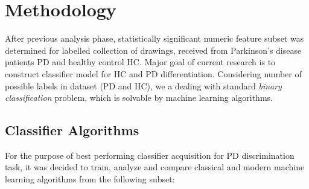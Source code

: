 \section{Methodology}

After previous analysis phase, statistically significant numeric feature subset was determined for labelled collection of drawings, received from Parkinson's disease patients PD and healthy control HC. Major goal of current research is to construct classifier model for HC and PD differentiation. Considering number of possible labels in dataset (PD and HC), we a dealing with standard \textit{binary classification} problem, which is solvable by machine learning algorithms. 

\subsection{Classifier Algorithms}

For the purpose of best performing classifier acquisition for PD discrimination task, it was decided to train, analyze and compare classical and modern machine learning algorithms from the following subset:

